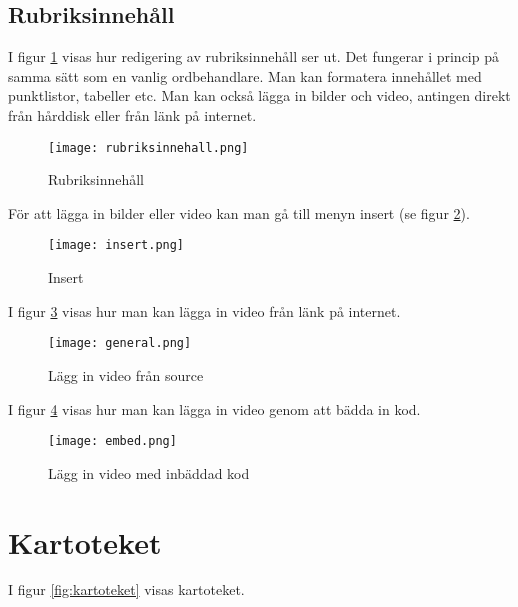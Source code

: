 \documentclass[12pt]{amsart}
\begin{document}
\subsection{Rubriksinnehåll}


I figur \ref{fig:rubriksinnehall} visas hur redigering av rubriksinnehåll ser ut. Det fungerar i princip på samma sätt som en vanlig ordbehandlare. Man kan formatera innehållet med punktlistor, tabeller etc. Man kan också lägga in bilder och video, antingen direkt från hårddisk eller från länk på internet.

\begin{figure}[H]
	\begin{center}
	\texttt{[image: rubriksinnehall.png]}
	\caption{Rubriksinnehåll}
	\label{fig:rubriksinnehall}
	\end{center}
\end{figure}

För att lägga in bilder eller video kan man gå till menyn insert (se figur \ref{fig:insert}).

\begin{figure}[H]
	\begin{center}
	\texttt{[image: insert.png]}
	\caption{Insert}
	\label{fig:insert}
	\end{center}
\end{figure}

I figur \ref{fig:general} visas hur man kan lägga in video från länk på internet.

\begin{figure}[H]
	\begin{center}
	\texttt{[image: general.png]}
	\caption{Lägg in video från source}
	\label{fig:general}
	\end{center}
\end{figure}

I figur \ref{fig:embed} visas hur man kan lägga in video genom att bädda in kod.

\begin{figure}[H]
	\begin{center}
	\texttt{[image: embed.png]}
	\caption{Lägg in video med inbäddad kod}
	\label{fig:embed}
	\end{center}
\end{figure}

\section{Kartoteket}
I figur \ref{fig:kartoteket} visas kartoteket.
\end{document}
